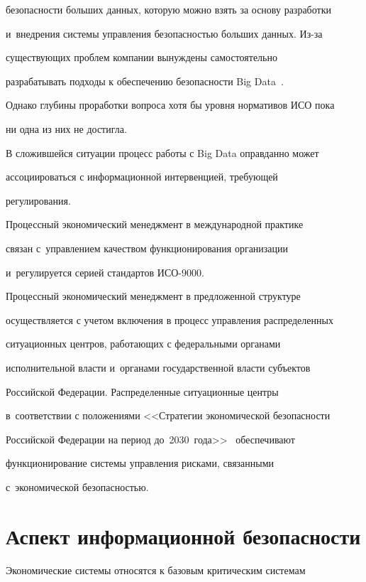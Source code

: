 безопасности больших данных, которую можно взять за основу разработки 

и~внедрения системы управления безопасностью больших данных. Из-за 

существующих проблем компании вынуждены самостоятельно 

разрабатывать подходы к обеспечению безопасности Big Data~\cite{5-zk}. 

Однако глубины проработки вопроса хотя бы уровня нормативов ИСО пока 

ни одна из них не достигла.

  

  В сложившейся ситуации процесс работы с Big Data оправданно может 

ассоциироваться с информационной интервенцией, требующей 

регулирования.

  

  Процессный экономический менеджмент в международной практике 

связан с~управ\-ле\-ни\-ем качеством функционирования организации 

и~регулируется серией стандартов ИСО-9000.

  

  Процессный экономический менеджмент в предложенной структуре 

осуществляется с учетом включения в процесс управления распределенных 

ситуационных центров, работающих с федеральными органами 

исполнительной власти и~органами государственной власти субъектов 

Российской Федерации. Распределенные ситуационные центры 

в~соответствии с положениями <<Стратегии экономической безопасности 

Российской Федерации на период до~2030~года>>~\cite{8-zk} обеспечивают 

функционирование системы управления рисками, связанными 

с~экономической безопасностью.

  

\section{Аспект информационной безопасности}

  

  Экономические системы относятся к базовым критическим системам 

